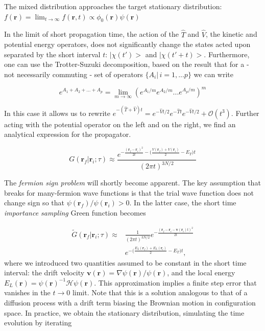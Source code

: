 \documentclass[10pt, twocolumn, twoside]{article}
\begin{document}
The mixed distribution approaches the target stationary distribution: $f(\bm r) = \lim_{t\rightarrow \infty} f(\bm r, t) \propto \phi_0(\bm r) \psi (\bm r) $

In the limit of short propagation time, the action of the $\hat T$ and $\hat V$, the kinetic and potential energy operators, does not significantly change the states acted upon separated by the short interval $t$: $| \chi (t') >$ and $|\chi (t'+t) >$. Furthermore, one can use the Trotter-Suzuki decomposition, based on the result that for a - not necessarily commuting - set of operators $\{A_i | \, i = 1,...p\}$  we can write

\begin{equation}
e^{A_1 + A_2 + ... + A_p} = \lim_{m\rightarrow \infty} ( e^{A_1/m}e^{A_2/m}...e^{A_p/m})^m
\end{equation}

In this case it allows us to rewrite $e^{-(\hat T + \hat V) t} = e^{-\hat V t/2} e^{-\hat T t} e^{-\hat V t/2} + \mathcal{O}(t^3) $. Further acting with the potential operator on the left and on the right, we find an analytical expression for the propagator.

\begin{equation}
G(\bm r_f | \bm r_i ; \tau) \approx \frac{e^{-\frac{(\bm r_f - \bm r_i)^2}{2t} -\big( \frac{V(\bm r_f) + V(\bm r_i)}{2} - E_T \big) t}}{(2\pi t)^{3N/2}} 
\end{equation}

The \emph{fermion sign problem} will shortly become apparent. The key assumption that breaks for many-fermion wave functions is that the trial wave function does not change sign so that $\psi (\bm r_f) / \psi (\bm r_i) > 0$. In the latter case, the short time \emph{importance sampling} Green function becomes

\begin{equation}
\begin{split}
\tilde{G}(\bm r_f | \bm r_i ; \tau) \approx & \frac{1}{(2\pi t)^{3N/2}} e^{-\frac{(\bm r_f - \bm r_i - \bm v(\bm r_i)t )^2}{2t}} \\
&e^{-\big( \frac{E_L(\bm r_f) + E_L(\bm r_i)}{2} - E_T \big) t} ,
\end{split}
\end{equation}
where we introduced two quantities assumed to be constant in the short time interval: the drift velocity $\bm v(\bm r) = \nabla \psi (\bm r) / \psi (\bm r)$, and the local energy $E_L (\bm r) = \psi (\bm r)^{-1} \mathcal{H} \psi (\bm r)$. This approximation implies a finite step error that vanishes in the $t \rightarrow 0$ limit. Note that this is a solution analogous to that of a diffusion process with a drift term biasing the Brownian motion in configuration space. In practice, we obtain the stationary distribution, simulating the time evolution by iterating
\end{document}
